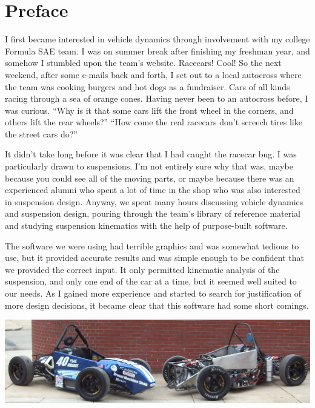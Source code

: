 \chapter{Preface}

I first became interested in vehicle dynamics through involvement with my college Formula SAE team.  I was on summer break after finishing my freshman year, and somehow I stumbled upon the team's website.  Racecars!  Cool!  So the next weekend, after some e-mails back and forth, I set out to a local autocross where the team was cooking burgers and hot dogs as a fundraiser.  Cars of all kinds racing through a sea of orange cones.  Having never been to an autocross before, I was curious.  ``Why is it that some cars lift the front wheel in the corners, and others lift the rear wheels?''  ``How come the real racecars don't screech tires like the street cars do?''

It didn't take long before it was clear that I had caught the racecar bug.  I was particularly drawn to suspensions.  I'm not entirely sure why that was, maybe because you could see all of the moving parts, or maybe because there was an experienced alumni who spent a lot of time in the shop who was also interested in suspension design.  Anyway, we spent many hours discussing vehicle dynamics and suspension design, pouring through the team's library of reference material and studying suspension kinematics with the help of purpose-built software.

The software we were using had terrible graphics and was somewhat tedious to use, but it provided accurate results and was simple enough to be confident that we provided the correct input.  It only permitted kinematic analysis of the suspension, and only one end of the car at a time, but it seemed well suited to our needs.  As I gained more experience and started to search for justification of more design decisions, it became clear that this software had some short comings.



\includegraphics[width=\textwidth]{images/04-05cars}